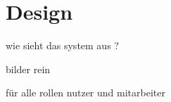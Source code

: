 \section*{Design}

wie sieht das system aus ? 

bilder rein 

für alle rollen
nutzer und mitarbeiter
